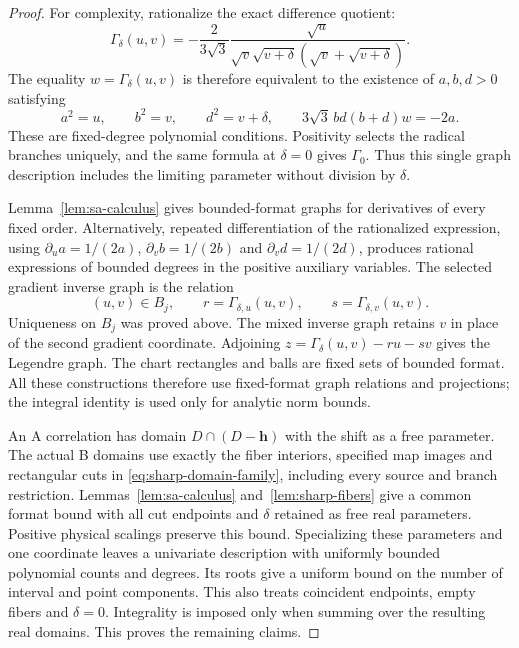 \documentclass[11pt,a4paper]{article}
\numberwithin{equation}{section}
\theoremstyle{remark}
\begin{document}
\begin{proof}
For complexity, rationalize the exact difference quotient:
\[
 \Gamma_\delta(u,v)
 =-\frac{2}{3\sqrt3}
   \frac{\sqrt u}{\sqrt v\sqrt{v+\delta}
                      (\sqrt v+\sqrt{v+\delta})}.
\]
The equality $w=\Gamma_\delta(u,v)$ is therefore equivalent to the
existence of $a,b,d>0$ satisfying
\begin{equation}\label{eq:caseB-stability-graph}
 a^2=u,\qquad b^2=v,\qquad d^2=v+\delta,\qquad
 3\sqrt3\,bd(b+d)w=-2a.
\end{equation}
These are fixed-degree polynomial conditions. Positivity selects the
radical branches uniquely, and the same formula at $\delta=0$ gives
$\Gamma_0$. Thus this single graph description includes the limiting
parameter without division by $\delta$.

Lemma~\ref{lem:sa-calculus} gives bounded-format graphs for derivatives
of every fixed order. Alternatively, repeated differentiation of the
rationalized expression, using $\partial_u a=1/(2a)$,
$\partial_v b=1/(2b)$ and $\partial_v d=1/(2d)$, produces rational
expressions of bounded degrees in the positive auxiliary variables.
The selected gradient inverse graph is the relation
\[
 (u,v)\in B_j,\qquad
 r=\Gamma_{\delta,u}(u,v),\qquad s=\Gamma_{\delta,v}(u,v).
\]
Uniqueness on $B_j$ was proved above. The mixed inverse graph retains
$v$ in place of the second gradient coordinate. Adjoining
$z=\Gamma_\delta(u,v)-ru-sv$ gives the Legendre graph. The chart
rectangles and balls are fixed sets of bounded format. All these
constructions therefore use fixed-format graph relations and projections;
the integral identity is used only for analytic norm bounds.

An A correlation has domain $D\cap(D-\mathbf h)$ with the shift as a free
parameter. The actual B domains use exactly the fiber interiors,
specified map images and rectangular cuts in
\eqref{eq:sharp-domain-family}, including every source and branch
restriction. Lemmas~\ref{lem:sa-calculus} and~\ref{lem:sharp-fibers}
give a common format bound with all cut endpoints and $\delta$ retained
as free real parameters. Positive physical scalings preserve this bound.
Specializing these parameters and one coordinate leaves a univariate
description with uniformly bounded polynomial counts and degrees.
Its roots give a uniform bound on the number of interval and point
components. This also treats coincident endpoints, empty fibers and
$\delta=0$. Integrality is imposed only when summing over the resulting
real domains. This proves the remaining claims.
\end{proof}
\end{document}

